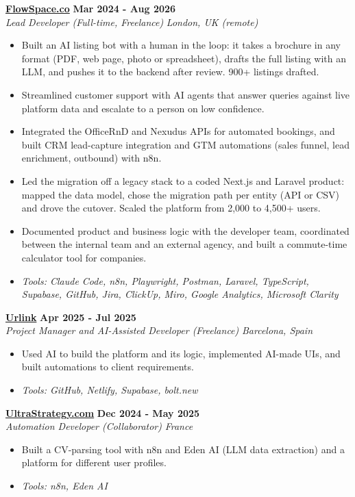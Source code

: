 \documentclass[a4paper,11pt]{article}
\newcommand{\role}[4]{%
 \textbf{#1} \hfill \textbf{#2}\\[1pt]%
 \textit{#3} \hfill \textit{#4}\\[2pt]%
}
\begin{document}
\role{\href{https://flowspace.co}{FlowSpace.co}}{Mar 2024 - Aug 2026}{Lead Developer (Full-time, Freelance)}{London, UK (remote)}
\begin{itemize}
 \item Built an AI listing bot with a human in the loop: it takes a brochure in any format (PDF, web page, photo or spreadsheet), drafts the full listing with an LLM, and pushes it to the backend after review. 900+ listings drafted.
 \item Streamlined customer support with AI agents that answer queries against live platform data and escalate to a person on low confidence.
 \item Integrated the OfficeRnD and Nexudus APIs for automated bookings, and built CRM lead-capture integration and GTM automations (sales funnel, lead enrichment, outbound) with n8n.
 \item Led the migration off a legacy stack to a coded Next.js and Laravel product: mapped the data model, chose the migration path per entity (API or CSV) and drove the cutover. Scaled the platform from 2,000 to 4,500+ users.
 \item Documented product and business logic with the developer team, coordinated between the internal team and an external agency, and built a commute-time calculator tool for companies.
 \item \textit{Tools: Claude Code, n8n, Playwright, Postman, Laravel, TypeScript, Supabase, GitHub, Jira, ClickUp, Miro, Google Analytics, Microsoft Clarity}
\end{itemize}

\role{\href{https://smarturlink.com/}{Urlink}}{Apr 2025 - Jul 2025}{Project Manager and AI-Assisted Developer (Freelance)}{Barcelona, Spain}
\begin{itemize}
 \item Used AI to build the platform and its logic, implemented AI-made UIs, and built automations to client requirements.
 \item \textit{Tools: GitHub, Netlify, Supabase, bolt.new}
\end{itemize}

\role{\href{https://ultrastrategy.com}{UltraStrategy.com}}{Dec 2024 - May 2025}{Automation Developer (Collaborator)}{France}
\begin{itemize}
 \item Built a CV-parsing tool with n8n and Eden AI (LLM data extraction) and a platform for different user profiles.
 \item \textit{Tools: n8n, Eden AI}
\end{itemize}
\end{document}
